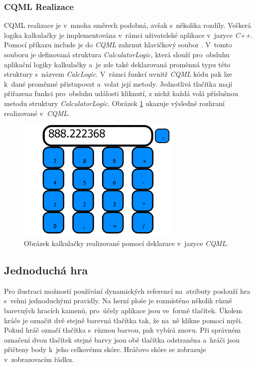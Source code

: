 \documentclass[11pt,twoside,a4paper]{book}
\begin{document}
\subsubsection{CQML Realizace}
CQML realizace je v~mnoha směrech podobná, avšak s~několika rozdíly. Veškerá logika kalkulačky je implementována v~rámci uživatelské aplikace v~jazyce \textit{C++}. Pomocí příkazu include je do \textit{CQML} zahrnut hlavičkový soubor . V~tomto souboru je definovaná struktura \textit{CalculatorLogic}, která slouží pro~obsluhu aplikační logiky kalkulačky a~je zde také deklarovaná proměnná typu této struktury s~názvem \textit{CalcLogic}. V~rámci funkcí uvnitř \textit{CQML} kódu pak lze k~dané proměnné přistupovat a~volat její metody. Jednotlivá tlačítka mají přiřazena funkci pro~obsluhu události kliknutí, z nichž každá volá příslušnou metodu struktury \textit{CalculatorLogic}. Obrázek \ref{fig:outCalcCQML} ukazuje výsledné rozhraní realizované v~\textit{CQML}.
\begin{figure}[!ht]
\begin{center}
  \includegraphics[width=0.7\textwidth]{figures/cqmlCalc}
\caption{{\label{fig:outCalcCQML}}Obrázek kalkulačky realizované pomocí deklarace v~jazyce \textit{CQML}.}
\end{center}
\end{figure}



\subsection{Jednoduchá hra}
Pro ilustraci možností používání dynamických referencí na~atributy poslouží hra s~velmi jednoduchými pravidly. Na herní ploše je rozmístěno několik různě barevných hracích kamenů, pro~účely aplikace jsou ve~formě tlačítek. Úkolem hráče je označit dvě stejně barevná tlačítka tak, že na~ně klikne pomocí myši. Pokud hráč označí tlačítka s~různou barvou, pak vybírá znovu. Při správném označení dvou tlačítek stejné barvy jsou obě tlačítka odstraněna a~hráči jsou přičteny body k~jeho celkovému skóre. Hráčovo skóre se zobrazuje v~zobrazovacím řádku.
\end{document}
